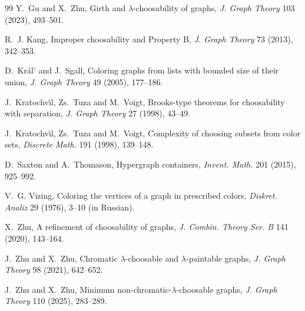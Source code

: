 \documentclass[12pt]{article}
\numberwithin{equation}{section}
\theoremstyle{definition}
\begin{document}
\begin{thebibliography}{99}
Y.~Gu and X.~Zhu,
\newblock Girth and $\lambda$-choosability of graphs,
\newblock \emph{J. Graph Theory} 103 (2023), 493--501.

R.~J. Kang,
\newblock Improper choosability and Property B,
\newblock \emph{J. Graph Theory} 73 (2013), 342--353.

D.~Kr\'al' and J.~Sgall,
\newblock Coloring graphs from lists with bounded size of their union,
\newblock \emph{J. Graph Theory} 49 (2005), 177--186.

J.~Kratochv{\'\i}l, Zs.~Tuza and M.~Voigt,
\newblock Brooks-type theorems for choosability with separation,
\newblock \emph{J. Graph Theory} 27 (1998), 43--49.

J.~Kratochv{\'\i}l, Zs.~Tuza and M.~Voigt,
\newblock Complexity of choosing subsets from color sets,
\newblock \emph{Discrete Math.} 191 (1998), 139--148.

D.~Saxton and A.~Thomason,
\newblock Hypergraph containers,
\newblock \emph{Invent. Math.} 201 (2015), 925--992.

V.~G. Vizing,
\newblock Coloring the vertices of a graph in prescribed colors,
\newblock \emph{Diskret. Analiz} 29 (1976), 3--10 (in Russian).

X.~Zhu,
\newblock A refinement of choosability of graphs,
\newblock \emph{J. Combin. Theory Ser. B} 141 (2020), 143--164.

J.~Zhu and X.~Zhu,
\newblock Chromatic $\lambda$-choosable and $\lambda$-paintable graphs,
\newblock \emph{J. Graph Theory} 98 (2021), 642--652.

J.~Zhu and X.~Zhu,
\newblock Minimum non-chromatic-$\lambda$-choosable graphs,
\newblock \emph{J. Graph Theory} 110 (2025), 283--289.

\end{thebibliography}
\endgroup
\end{document}
